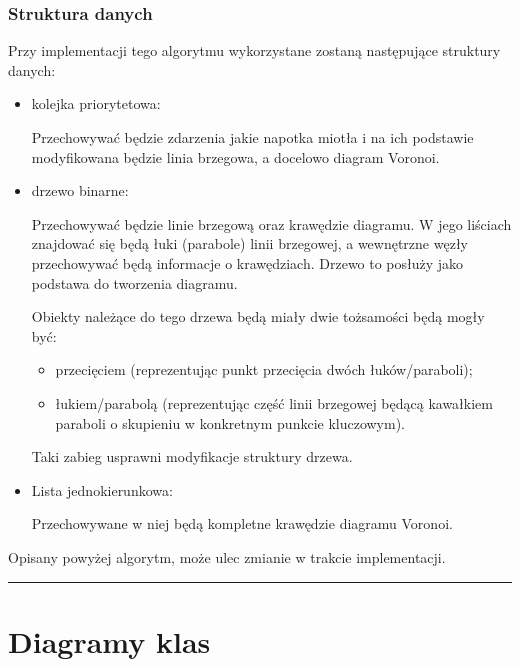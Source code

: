 \documentclass[a4paper,11pt]{article}
\newcommand{\linia}{\rule{\linewidth}{0.4mm}}
\begin{document}
\subsubsection{Struktura danych}
\noindent
Przy implementacji tego algorytmu wykorzystane zostaną następujące struktury danych:
\begin{itemize}
\item kolejka priorytetowa:

Przechowywać będzie zdarzenia jakie napotka miotła i na ich podstawie modyfikowana będzie linia brzegowa, a docelowo diagram Voronoi.
\item drzewo binarne:

Przechowywać będzie linie brzegową oraz krawędzie diagramu. W jego liściach znajdować się będą łuki (parabole) linii brzegowej, a wewnętrzne węzły przechowywać będą informacje o krawędziach. Drzewo to posłuży jako podstawa do tworzenia diagramu.

Obiekty należące do tego drzewa będą miały dwie tożsamości będą mogły być:
\begin{itemize}
\item przecięciem (reprezentując punkt przecięcia dwóch łuków/paraboli);
\item łukiem/parabolą (reprezentując część linii brzegowej będącą kawałkiem paraboli o skupieniu w konkretnym punkcie kluczowym).
\end{itemize}

Taki zabieg usprawni modyfikacje struktury drzewa.
\item Lista jednokierunkowa:

Przechowywane w niej będą kompletne krawędzie diagramu Voronoi.
\end{itemize}

Opisany powyżej algorytm, może ulec zmianie w trakcie implementacji.

\noindent\linia
\section{Diagramy klas}
\end{document}
